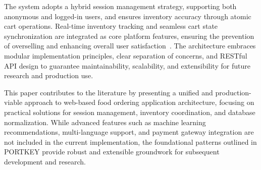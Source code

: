 The system adopts a hybrid session management strategy, supporting both anonymous and logged-in users, and ensures inventory accuracy through atomic cart operations. Real-time inventory tracking and seamless cart state synchronization are integrated as core platform features, ensuring the prevention of overselling and enhancing overall user satisfaction~\cite{b2}. The architecture embraces modular implementation principles, clear separation of concerns, and RESTful API design to guarantee maintainability, scalability, and extensibility for future research and production use.

This paper contributes to the literature by presenting a unified and production-viable approach to web-based food ordering application architecture, focusing on practical solutions for session management, inventory coordination, and database normalization. While advanced features such as machine learning recommendations, multi-language support, and payment gateway integration are not included in the current implementation, the foundational patterns outlined in PORTKEY provide robust and extensible groundwork for subsequent development and research.
